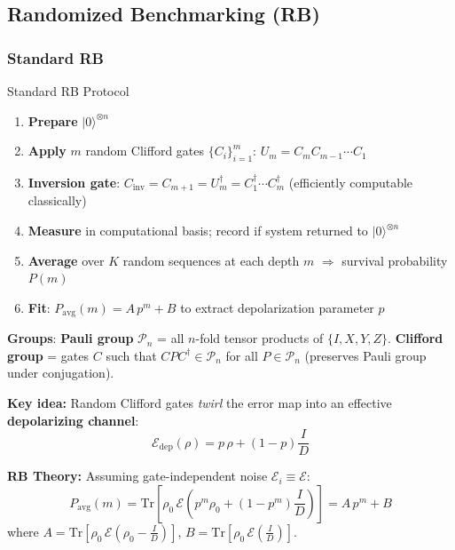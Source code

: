 \documentclass[10pt,a4paper]{article}
\begin{document}
\subsection{Randomized Benchmarking (RB)}

\subsubsection{Standard RB}

\begin{algorithmbox}{Standard RB Protocol}
\begin{enumerate}
  \item \textbf{Prepare} $|0\rangle^{\otimes n}$
  \item \textbf{Apply} $m$ random Clifford gates $\{C_i\}_{i=1}^m$: \quad $U_m = C_m C_{m-1}\cdots C_1$
  \item \textbf{Inversion gate}: $C_{\mathrm{inv}} = C_{m+1} = U_m^\dagger = C_1^\dagger \cdots C_m^\dagger$ \quad (efficiently computable classically)
  \item \textbf{Measure} in computational basis; record if system returned to $|0\rangle^{\otimes n}$
  \item \textbf{Average} over $K$ random sequences at each depth $m$ $\Rightarrow$ survival probability $P(m)$
  \item \textbf{Fit}: $P_{\mathrm{avg}}(m) = A\,p^m + B$ \quad to extract depolarization parameter $p$
\end{enumerate}
\end{algorithmbox}

\textbf{Groups}: \textbf{Pauli group} $\mathcal{P}_n$ = all $n$-fold tensor products of $\{I, X, Y, Z\}$. \textbf{Clifford group} = gates $C$ such that $C P C^\dagger \in \mathcal{P}_n$ for all $P \in \mathcal{P}_n$ (preserves Pauli group under conjugation).

\textcolor{alertred}{\textbf{Key idea:}} Random Clifford gates \emph{twirl} the error map into an effective \textbf{depolarizing channel}:
\begin{equation}
  \mathcal{E}_{\mathrm{dep}}(\rho) = p\,\rho + (1-p)\frac{I}{D}
\end{equation}

\textcolor{mathpurple}{\textbf{RB Theory:}} Assuming gate-independent noise $\mathcal{E}_i \equiv \mathcal{E}$:
\begin{equation}
P_{\mathrm{avg}}(m) = \mathrm{Tr}\!\left[\rho_0\, \mathcal{E}\!\left(p^m \rho_0 + (1-p^m)\frac{I}{D}\right)\right] = A\,p^m + B
\end{equation}
where $A = \mathrm{Tr}\!\left[\rho_0\,\mathcal{E}\!\left(\rho_0 - \frac{I}{D}\right)\right]$, $B = \mathrm{Tr}\!\left[\rho_0\,\mathcal{E}\!\left(\frac{I}{D}\right)\right]$.
\end{document}
